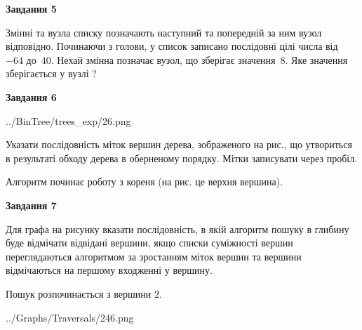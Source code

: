 \documentclass[12pt, ukrainian]{article}
\begin{document}
{\begin {large}
{\begin {center}\textbf{Завдання 5}\end {center}}\par
Змінні  та  вузла списку позначають наступний та попередній за ним вузол відповідно. Починаючи з голови, у список записано послідовні цілі числа від~$-64$ до~$40$. Нехай змінна  позначає вузол, що зберігає значення~$8$.
Яке значення зберігається у вузлі  ?\par
\newpage

{\begin {center}\textbf{Завдання 6}\end {center}}\par

\begin{center}
	{../BinTree/trees_exp/26.png}
\end{center}
Указати послідовність міток вершин дерева, зображеного на рис., що утвориться в результаті обходу дерева в оберненому порядку. Мітки записувати через пробіл.\par Алгоритм починає роботу з кореня (на рис. це верхня вершина).\par
\newpage

{\begin {center}\textbf{Завдання 7}\end {center}}\par
Для графа на рисунку вказати послідовність, в якій алгоритм пошуку в глибину буде відмічати відвідані вершини, якщо списки суміжності вершин переглядаються алгоритмом за зростанням міток вершин та вершини відмічаються на першому вход\-женні у вершину.\par
Пошук розпочинається з вершини 2.\par

\begin{center}
	{../Graphs/Traversals/246.png}
\end{center}\par
\newpage


\end{large}}
\end{document}
